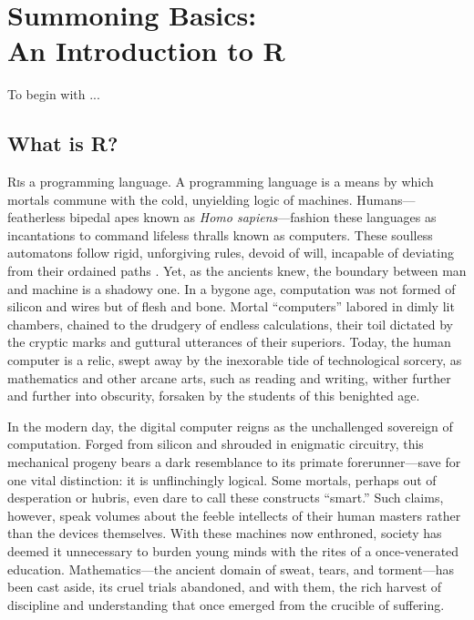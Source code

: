 \chapter[Summoning Basics: An Introduction to R]{Summoning Basics: \\ \huge An Introduction to R}

\IMFellEnglish

To begin with ...

\section[What is R?]{What is R?}

\lettrine[lines=5, realheight]{R} is a \gls{programming language}. A programming language is a means by which mortals commune with the cold, unyielding logic of machines. Humans—featherless bipedal apes known as \textit{Homo sapiens}—fashion these languages as incantations to command lifeless thralls known as computers. These soulless automatons follow rigid, unforgiving rules, devoid of will, incapable of deviating from their ordained paths \parencite{Turing1950}. Yet, as the ancients knew, the boundary between man and machine is a shadowy one. In a bygone age, computation was not formed of silicon and wires but of flesh and bone. Mortal ``computers'' labored in dimly lit chambers, chained to the drudgery of endless calculations, their toil dictated by the cryptic marks and guttural utterances of their superiors. Today, the human computer is a relic, swept away by the inexorable tide of technological sorcery, as mathematics and other arcane arts, such as reading and writing, wither further and further into obscurity, forsaken by the students of this benighted age.

In the modern day, the digital computer reigns as the unchallenged sovereign of computation. Forged from silicon and shrouded in enigmatic circuitry, this mechanical progeny bears a dark resemblance to its primate forerunner—save for one vital distinction: it is unflinchingly logical. Some mortals, perhaps out of desperation or hubris, even dare to call these constructs ``smart.'' Such claims, however, speak volumes about the feeble intellects of their human masters rather than the devices themselves. With these machines now enthroned, society has deemed it unnecessary to burden young minds with the rites of a once-venerated education. Mathematics—the ancient domain of sweat, tears, and torment—has been cast aside, its cruel trials abandoned, and with them, the rich harvest of discipline and understanding that once emerged from the crucible of suffering.

